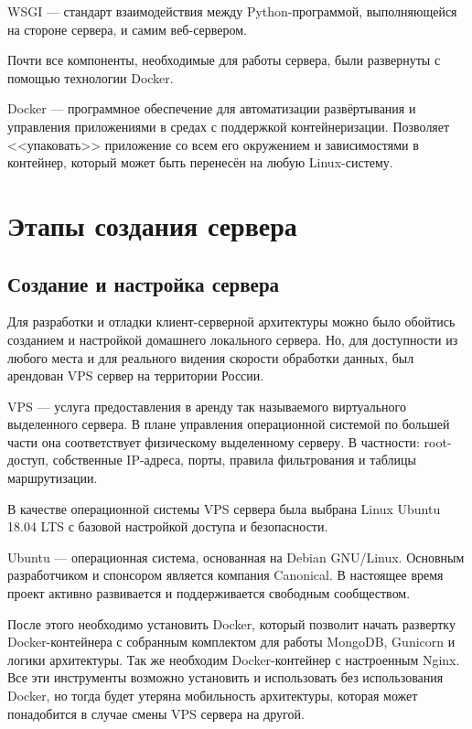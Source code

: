 \begin{definition}
    WSGI --- стандарт взаимодействия между Python-программой, выполняющейся на стороне сервера, и самим веб-сервером.
\end{definition}

Почти все компоненты, необходимые для работы сервера, были развернуты с помощью технологии Docker.
\begin{definition}
    Docker --- программное обеспечение для автоматизации развёртывания и управления приложениями в средах с поддержкой контейнеризации.
    Позволяет <<упаковать>> приложение со всем его окружением и зависимостями в контейнер, который может быть перенесён на любую Linux-систему.
\end{definition}


\clearpage
\section{Этапы создания сервера}
\subsection{Создание и настройка сервера}
Для разработки и отладки клиент-серверной архитектуры можно было обойтись созданием и настройкой домашнего локального сервера.
Но, для доступности из любого места и для реального видения скорости обработки данных, был арендован VPS сервер на территории России.

\begin{definition}
    VPS --- услуга предоставления в аренду так называемого виртуального выделенного сервера.
    В плане управления операционной системой по большей части она соответствует физическому выделенному серверу.
    В частности: root-доступ, собственные IP-адреса, порты, правила фильтрования и таблицы маршрутизации.
\end{definition}

В качестве операционной системы VPS сервера была выбрана Linux Ubuntu 18.04 LTS с базовой настройкой доступа и безопасности.
\begin{definition}
    Ubuntu --- операционная система, основанная на Debian GNU/Linux. Основным разработчиком и спонсором является компания Canonical. 
    В настоящее время проект активно развивается и поддерживается свободным сообществом.
\end{definition}

После этого необходимо установить Docker, который позволит начать развертку Docker-контейнера с собранным комплектом для работы MongoDB,
Gunicorn и логики архитектуры. Так же необходим Docker-контейнер с настроенным Nginx.
Все эти инструменты возможно установить и использовать без использования Docker,
но тогда будет утеряна мобильность архитектуры, которая может понадобится в случае смены VPS сервера на другой.


